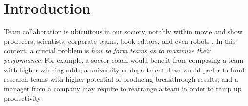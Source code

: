 
\chapter{Introduction}
\label{chapter:intro}
Team collaboration is ubiquitous in our society, notably within movie and show
producers, scientists, corporate teams, book editors, and even robots
\citep{fields2011analysis, grund2012network, GunnA15, nemoto2011social,
tseng2004novel, wi2009team}. In this context, a crucial problem is \textit{how
to form teams as to maximize their performance}.  For example, a soccer coach
would benefit from composing a team with higher winning odds; a university or
department dean would prefer to fund research teams with higher potential of
producing breakthrough results; and a manager from a company may require to
rearrange a team in order to ramp up productivity. 

